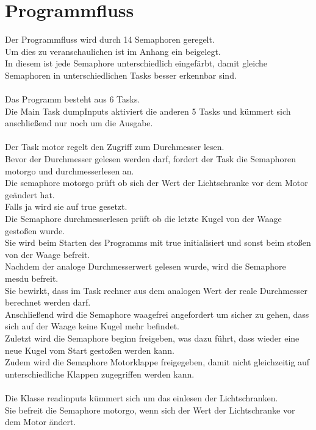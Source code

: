 \section{Programmfluss}
Der Programmfluss wird durch 14 Semaphoren geregelt.\\
Um dies zu veranschaulichen ist im Anhang ein  beigelegt.\\
In diesem ist jede Semaphore unterschiedlich eingefärbt, damit gleiche Semaphoren in unterschiedlichen Tasks besser erkennbar sind.\\
\\
Das Programm besteht aus 6 Tasks.\\
Die Main Task dumpInputs aktiviert die anderen 5 Tasks und kümmert sich anschließend nur noch um die Ausgabe.\\
\\
Der Task motor regelt den Zugriff zum Durchmesser lesen.\\
Bevor der Durchmesser gelesen werden darf, fordert der Task die Semaphoren motorgo und durchmesserlesen an.\\
Die semaphore motorgo prüft ob sich der Wert der Lichtschranke vor dem Motor geändert hat.\\
Falls ja wird sie auf true gesetzt.\\
Die Semaphore durchmesserlesen prüft ob die letzte Kugel von der Waage gestoßen wurde.\\
Sie wird beim Starten des Programms mit true initialisiert und sonst beim stoßen von der Waage befreit.\\
Nachdem der analoge Durchmesserwert gelesen wurde, wird die Semaphore mesdu befreit.\\
Sie bewirkt, dass im Task rechner aus dem analogen Wert der reale Durchmesser berechnet werden darf.\\
Anschließend wird die Semaphore waagefrei angefordert um sicher zu gehen, dass sich auf der Waage keine Kugel mehr befindet.\\
Zuletzt wird die Semaphore beginn freigeben, was dazu führt, dass wieder eine neue Kugel vom Start gestoßen werden kann.\\
Zudem wird die Semaphore Motorklappe freigegeben, damit nicht gleichzeitig auf unterschiedliche Klappen zugegriffen werden kann.\\
\\
Die Klasse readinputs kümmert sich um das einlesen der Lichtschranken.\\
Sie befreit die Semaphore motorgo, wenn sich der Wert der Lichtschranke vor dem Motor ändert.\\
